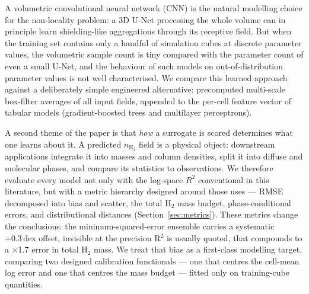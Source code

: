 \documentclass[fleqn,usenatbib]{rasti}
\newcommand{\nHH}{n_{\mathrm{H_2}}}
\newcommand{\dex}{\,\text{dex}}
\newcommand{\Rsq}{R^2}
\begin{document}
A volumetric convolutional neural network (CNN) is the natural
modelling choice for the non-locality problem: a 3D U-Net
\citep{Ronneberger2015,Cicek2016} processing the whole volume can in
principle learn shielding-like aggregations through its receptive field.
But when the training set contains only a handful of simulation cubes at
discrete parameter values, the volumetric sample count is tiny compared
with the parameter count of even a small U-Net, and the behaviour of
such models on out-of-distribution parameter values is not well
characterised. We compare this learned approach against a deliberately
simple engineered alternative: precomputed multi-scale box-filter
averages of all input fields, appended to the per-cell feature vector of
tabular models (gradient-boosted trees and multilayer perceptrons).

A second theme of the paper is that \emph{how} a surrogate is scored
determines what one learns about it. A predicted \(\nHH\) field is a
physical object: downstream applications integrate it into masses and
column densities, split it into diffuse and molecular phases, and
compare its statistics to observations. We therefore evaluate every
model not only with the log-space \(\Rsq\) conventional in this
literature, but with a metric hierarchy designed around those uses ---
RMSE decomposed into bias and scatter, the total H\(_2\) mass budget,
phase-conditional errors, and distributional distances
(Section~\ref{sec:metrics}). These metrics change the conclusions: the
minimum-squared-error ensemble carries a systematic \(+0.3\dex\) offset,
invisible at the precision R\(^2\) is usually quoted, that compounds to a
\(\times\)1.7 error in total H\(_2\) mass. We treat that bias as a
first-class modelling target, comparing two designed calibration
functionals --- one that centres the cell-mean log error and one that
centres the mass budget --- fitted only on training-cube quantities.
\end{document}
